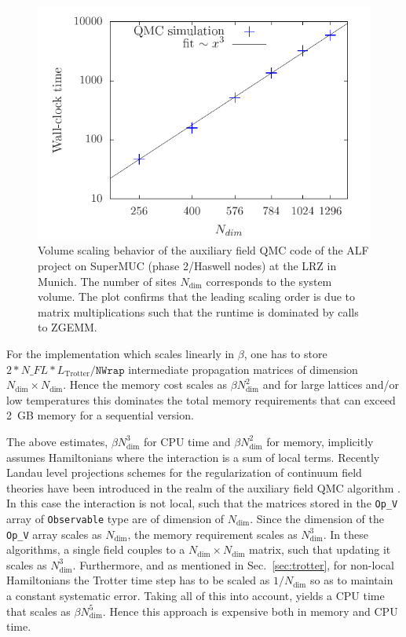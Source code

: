 \begin{figure}[h]
	\begin{center}
		\includegraphics[scale=.8]{Figures/Size_scaling_ALF_2.pdf}
	\end{center}
	\caption{\label{fig_scaling_size}Volume scaling behavior of the auxiliary field QMC code of the ALF project on SuperMUC (phase 2/Haswell nodes) at the LRZ in Munich. The number of sites $N_{\text{dim}}$ corresponds to the system volume.
	The plot confirms that the leading scaling order is due to matrix multiplications such that the runtime is dominated by calls to ZGEMM. }
\end{figure}

For the implementation which scales linearly in $\beta$, one has to store $2* N\_FL * L_{\text{Trotter}}/\texttt{NWrap}$ intermediate propagation matrices of dimension $N_{\text{dim}}\times N_{\text{dim}}$.   
Hence the memory cost scales as $ \beta N_{\text{dim}}^2$ and for  large lattices and/or low temperatures this dominates the total memory requirements that can exceed 2~GB memory for a sequential version.   

The above estimates,  $\beta N_{\text{dim}}^3 $ for CPU time and $\beta N_{\text{dim}}^2 $   for memory,   implicitly assumes   Hamiltonians where the interaction  is a sum of local terms.  
Recently  Landau level projections schemes for the   regularization of continuum field theories have been introduced in the realm of the auxiliary field QMC algorithm  \cite{Ippoliti18,WangZ20}. In  this case the interaction is not local,  such that the matrices stored in  the   \texttt{Op\_V} array  of \texttt{Observable} type   are of dimension of $N_{\text{dim}}$. Since the  dimension of the  \texttt{Op\_V}   array scales as $N_{\text{dim}}$, the memory  requirement scales as $N_{\text{dim}}^3$.    In these algorithms, a single field couples to a $N_{\text{dim}} \times  N_{\text{dim}} $ matrix, such that updating  it scales as $ N_{\text{dim}}^3$.  Furthermore, and as mentioned in Sec.~\ref{sec:trotter}, for non-local  Hamiltonians the  Trotter time step has to be scaled   as $1/N_{\text{dim}}$ so as to maintain a constant systematic error.  Taking all of this into account,    yields a CPU time that scales as $\beta N_{\text{dim}}^5$.    Hence  this approach  is expensive both in memory and CPU time. 

